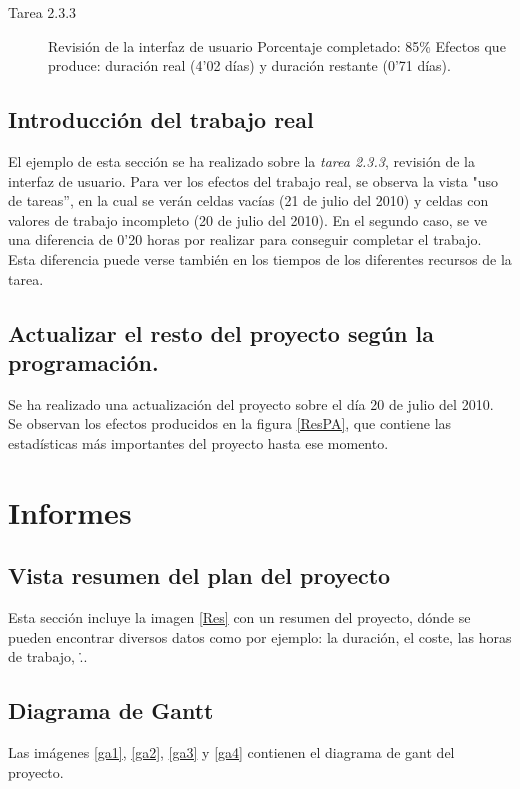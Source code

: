 \documentclass[11pt,a4paper,spanish,twoside]{book}
\begin{document}
\begin{description}
\item[Tarea 2.3.3] Revisión de la interfaz de usuario
  Porcentaje completado: 85\%
  Efectos que produce: duración real (4'02 días) y duración restante 
(0'71 días).
\end{description}

\section{Introducción del trabajo real}
El ejemplo de esta sección se ha realizado sobre la \emph{tarea 2.3.3}, 
revisión de la interfaz de usuario. Para ver los efectos del trabajo real, se 
observa la vista "uso de tareas'', en la cual se verán celdas vacías (21 de 
julio del 2010) y celdas con valores de trabajo incompleto (20 de julio del 
2010). En el segundo caso, se ve una diferencia de 0'20 horas por realizar para
conseguir completar el trabajo. Esta diferencia puede verse también en los 
tiempos de los diferentes recursos de la tarea.

\section{Actualizar el resto del proyecto según la programación.}
Se ha realizado una actualización del proyecto sobre el día 20 de julio del 
2010. Se observan los efectos producidos en la figura \ref{ResPA}, que contiene
las estadísticas más importantes del proyecto hasta ese momento.


\chapter{Informes}
\section{Vista resumen del plan del proyecto}
Esta sección incluye la imagen \ref{Res} con un resumen del proyecto, dónde
se pueden encontrar diversos datos como por ejemplo: la duración, el coste,
las horas de trabajo, \...


\section{Diagrama de Gantt}
Las imágenes \ref{ga1}, \ref{ga2}, \ref{ga3} y \ref{ga4} contienen el
diagrama de gant del proyecto.
\begin{sidewaystable}
\end{sidewaystable}
\end{document}
